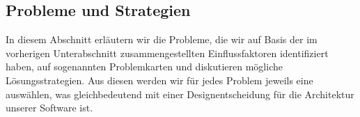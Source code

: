 \documentclass[enabledeprecatedfontcommands,fontsize=12pt,paper=a4,twoside,parskip=half]{scrartcl}
\newcounter{issue}
\newcounter{strategie}%
\begin{document}
\clearpage

\subsection{Probleme und Strategien}
\label{sec:strategien}







In diesem Abschnitt erläutern wir die Probleme, die wir auf Basis der im vorherigen Unterabschnitt zusammengestellten Einflussfaktoren identifiziert haben, auf sogenannten Problemkarten und diskutieren mögliche Lösungsstrategien. Aus diesen werden wir für jedes Problem jeweils eine auswählen, was gleichbedeutend mit einer Designentscheidung für die Architektur unserer Software ist.
\end{document}
